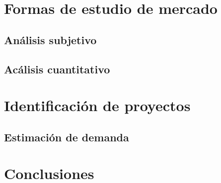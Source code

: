 \documentclass{article}
\begin{document}
	\section{Formas de estudio de mercado}
		\subsection{An\'alisis subjetivo}

		\subsection{Ac\'alisis cuantitativo}

	\section{Identificaci\'on de proyectos}
		\subsection{Estimaci\'on de demanda}

	\section{Conclusiones}

	
\end{document}
